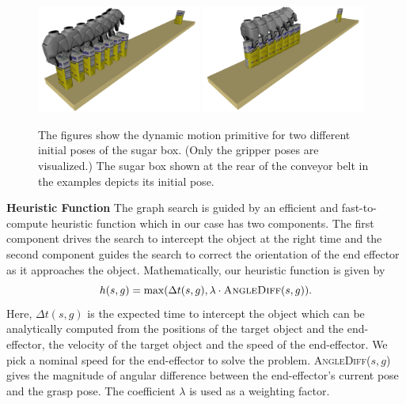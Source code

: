 \documentclass[a4paper]{report}
\begin{document}
\begin{figure}[t]
    \centering
        \includegraphics[width=0.48\textwidth]{amp1.png}
        \includegraphics[width=0.48\textwidth]{amp2.png}
    \caption{
    The figures show the dynamic motion primitive for two different initial poses of the sugar box. (Only the gripper poses are visualized.) The sugar box shown at the rear of the conveyor belt in the examples depicts its initial pose.
    }
    \label{fig:amp}
\end{figure}

\textbf{Heuristic Function}
The graph search is guided by an efficient and fast-to-compute heuristic function which in our case has two components.
The first component drives the search to intercept the object at the right time and 
the second component guides the search to correct the orientation of the end effector as it approaches the object. 
Mathematically, our heuristic function is given by
\begin{equation} \label{eq:h1}
 h(s,g) = \max (\Delta t(s,g), \lambda \cdot \textsc{AngleDiff}(s,g)).
\end{equation}
Here, $\Delta t(s,g)$ is the expected time to intercept the object which can be analytically computed from the positions of the target object and the end-effector, the velocity of the target object and the speed of the end-effector. We pick a nominal speed for the end-effector to solve the problem. \textsc{AngleDiff}($s,g$) gives the magnitude of angular difference between the end-effector's current pose and the grasp pose. The coefficient $\lambda$ is used as a weighting factor.
\end{document}
